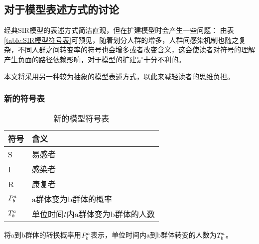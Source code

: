 \subsection{对于模型表述方式的讨论}
\par 经典SIR模型的表述方式简洁直观，但在扩建模型时会产生一些问题：
由表\ref{table:SIR模型符号表}可预见，随着划分人群的增多，人群间感染机制也随之复杂，不同人群之间转变率的符号也会增多或者改变含义，这会使读者对符号的理解产生负面的路径依赖影响，对于模型的扩建是十分不利的。
\par 本文将采用另一种较为抽象的模型表述方式，以此来减轻读者的思维负担。
\subsubsection{新的符号表}
\begin{table}[H]
    \centering
    \caption{新的模型符号表}
    \begin{tabular}{ll}
        \hline
        符号       & 含义                              \\
        \hline
        S          & 易感者                            \\
        I          & 感染者                            \\
        R          & 康复者                            \\
        $\P{a}{b}$ & a群体变为b群体的概率              \\
        $\T{a}{b}$ & 单位时间$t$内a群体变为b群体的人数 \\
        \hline
    \end{tabular}
\end{table}
\par 将a到b群体的转换概率用$\P{a}{b}$表示，单位时间内a到b群体转变的人数为$\T{a}{b}$。
